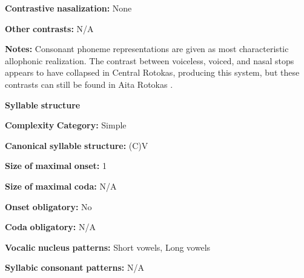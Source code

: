 \documentclass[output=paper]{langsci/langscibook}
\begin{document}
\begin{styleBody}
\textbf{Contrastive} \textbf{nasalization:} None
\end{styleBody}

\begin{styleBody}
\textbf{Other} \textbf{contrasts:} N/A
\end{styleBody}

\begin{styleBody}
\textbf{Notes:} Consonant phoneme representations are given as most characteristic allophonic realization. The contrast between voiceless, voiced, and nasal stops appears to have collapsed in Central Rotokas, producing this system, but these contrasts can still be found in Aita Rotokas \citep{Robinson2006}.
\end{styleBody}

\begin{styleBody}
\textbf{Syllable} \textbf{structure}
\end{styleBody}

\begin{styleBody}
\textbf{Complexity} \textbf{Category:} Simple
\end{styleBody}

\begin{styleBody}
\textbf{Canonical} \textbf{syllable} \textbf{structure:} (C)V \citep[28-9]{Robinson2011}
\end{styleBody}

\begin{styleBody}
\textbf{Size} \textbf{of} \textbf{maximal} \textbf{onset:} 1
\end{styleBody}

\begin{styleBody}
\textbf{Size} \textbf{of} \textbf{maximal} \textbf{coda:} N/A
\end{styleBody}

\begin{styleBody}
\textbf{Onset} \textbf{obligatory:} No
\end{styleBody}

\begin{styleBody}
\textbf{Coda} \textbf{obligatory:} N/A
\end{styleBody}

\begin{styleBody}
\textbf{Vocalic} \textbf{nucleus} \textbf{patterns:} Short vowels, Long vowels
\end{styleBody}

\begin{styleBody}
\textbf{Syllabic} \textbf{consonant} \textbf{patterns:} N/A
\end{styleBody}
\end{document}
